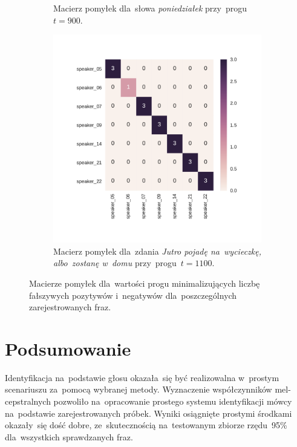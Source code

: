 \documentclass[11pt,a4paper]{article}
\begin{document}
\begin{figure}
\begin{subfigure}[t]{0.45\textwidth}
        \caption{Macierz pomyłek dla~słowa \emph{poniedziałek} przy~progu~$t = 900$.}
    \end{subfigure}
    \qquad
    \begin{subfigure}[t]{0.45\textwidth}
        \includegraphics[width=\textwidth]{res/plots/confusion_matrix_wycieczka.pdf}
        \caption{Macierz pomyłek dla~zdania \emph{Jutro pojadę na~wycieczkę, albo~zostanę w~domu} przy~progu~$t = 1100$.}
    \end{subfigure}
    \caption{Macierze pomyłek dla~wartości progu minimalizujących liczbę fałszywych pozytywów i~negatywów dla~poszczególnych zarejestrowanych fraz.}
    \label{fig:confusion-matrices}
\end{figure}

\section{Podsumowanie}

Identyfikacja na~podstawie głosu okazała~się być realizowalna w~prostym scenariuszu za~pomocą wybranej metody.
Wyznaczenie współczynników mel-cepstralnych pozwoliło na~opracowanie prostego systemu identyfikacji mówcy na~podstawie zarejestrowanych próbek.
Wyniki osiągnięte prostymi środkami okazały~się dość dobre, ze~skutecznością na~testowanym zbiorze rzędu~95\% dla~wszystkich sprawdzanych fraz.
\end{document}
